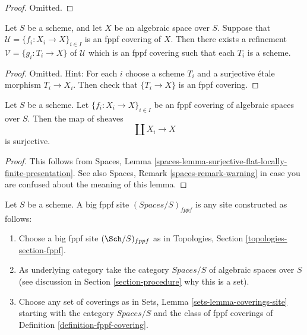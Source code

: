 \begin{proof}
Omitted.
\end{proof}

\begin{lemma}
\label{lemma-refine-fppf-schemes}
Let $S$ be a scheme, and let $X$ be an algebraic space over $S$.
Suppose that $\mathcal{U} = \{f_i : X_i \to X\}_{i \in I}$ is an
fppf covering of $X$. Then there exists a refinement
$\mathcal{V} = \{g_i : T_i \to X\}$ of $\mathcal{U}$ which is an
fppf covering such that each $T_i$ is a scheme.
\end{lemma}

\begin{proof}
Omitted. Hint: For each $i$ choose a scheme $T_i$ and a surjective \'etale
morphism $T_i \to X_i$. Then check that $\{T_i \to X\}$ is an fppf covering.
\end{proof}

\begin{lemma}
\label{lemma-fppf-covering-surjective}
Let $S$ be a scheme.
Let $\{f_i : X_i \to X\}_{i \in I}$ be an fppf covering of algebraic
spaces over $S$. Then the map of sheaves
$$
\coprod X_i \longrightarrow X
$$
is surjective.
\end{lemma}

\begin{proof}
This follows from
Spaces, Lemma \ref{spaces-lemma-surjective-flat-locally-finite-presentation}.
See also
Spaces, Remark \ref{spaces-remark-warning}
in case you are confused about the meaning of this lemma.
\end{proof}

\begin{definition}
\label{definition-big-fppf-site}
Let $S$ be a scheme. A big fppf site {\it $(\textit{Spaces}/S)_{fppf}$}
is any site constructed as follows:
\begin{enumerate}
\item Choose a big fppf site $(\Sch/S)_{fppf}$ as in
Topologies, Section \ref{topologies-section-fppf}.
\item As underlying category take the category $\textit{Spaces}/S$
of algebraic spaces over $S$ (see discussion in
Section \ref{section-procedure} why this is a set).
\item Choose any set of coverings as in
Sets, Lemma \ref{sets-lemma-coverings-site} starting with the
category $\textit{Spaces}/S$ and the class of fppf coverings
of Definition \ref{definition-fppf-covering}.
\end{enumerate}
\end{definition}

